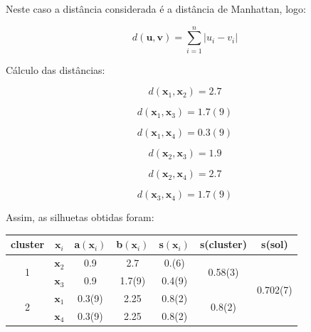 \documentclass[a4paper,12pt]{article} %
\begin{document}
\begin{enumerate}
Neste caso a distância considerada é a distância de Manhattan, logo:

\begin{equation}
    d(\mathbf{u},\mathbf{v}) = \sum_{i=1}^n |u_i - v_i|
\end{equation}

Cálculo das distâncias:

\begin{equation*}
    d(\mathbf{x}_1,\mathbf{x}_2) = 2.7
\end{equation*}

\begin{equation*}
    d(\mathbf{x}_1,\mathbf{x}_3) = 1.7(9)
\end{equation*}

\begin{equation*}
    d(\mathbf{x}_1,\mathbf{x}_4) = 0.3(9)
\end{equation*}

\begin{equation*}
    d(\mathbf{x}_2,\mathbf{x}_3) = 1.9
\end{equation*}

\begin{equation*}
    d(\mathbf{x}_2,\mathbf{x}_4) = 2.7
\end{equation*}

\begin{equation*}
    d(\mathbf{x}_3,\mathbf{x}_4) = 1.7(9)
\end{equation*}

Assim, as silhuetas obtidas foram:

\begin{table}[H]
\centering
\begin{tabular}{|c|c|c|c|c|c|c|}
\hline
cluster           & $\mathbf{x}_i$ & a$(\mathbf{x}_i)$ & b$(\mathbf{x}_i)$ & s$(\mathbf{x}_i)$  & s(cluster)& s(sol)\\ \hline
\multirow{2}{*}{1} & $\mathbf{x}_2$ & 0.9 & 2.7 & 0.(6)  & \multirow{2}{*}{0.58(3)} & \multirow{4}{*}{0.702(7)} \\ \cline{2-5}
                    & $\mathbf{x}_3$ & 0.9 & 1.7(9) & 0.4(9) & &  \\ \cline{1-6}
\multirow{2}{*}{2} & $\mathbf{x}_1$ & 0.3(9) & 2.25 &0.8(2) & \multirow{2}{*}{0.8(2)}  & \\ \cline{2-5}
                    & $\mathbf{x}_4$ & 0.3(9) & 2.25 & 0.8(2) &  &   \\ \hline
\end{tabular}
\end{table}


\end{enumerate}
\end{document}
